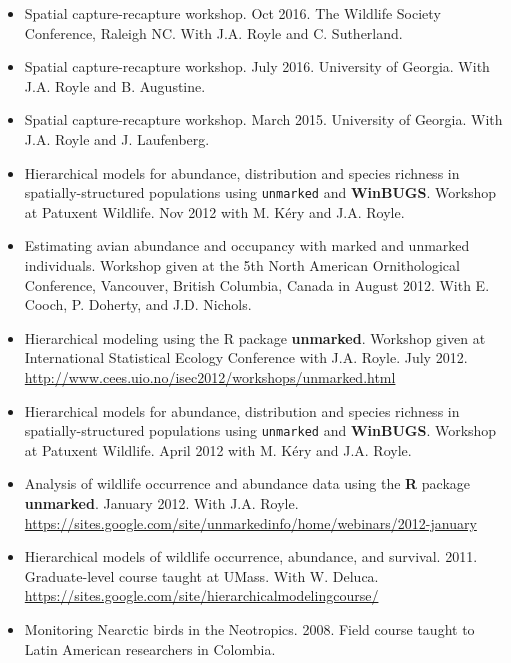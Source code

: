 \begin{itemize}

\item Spatial capture-recapture workshop. Oct 2016. The Wildlife
  Society Conference, Raleigh NC. With J.A. Royle and C. Sutherland. 

\item Spatial capture-recapture workshop. July 2016. University of
  Georgia. With J.A. Royle and B. Augustine.

\item Spatial capture-recapture workshop. March 2015. University of
  Georgia. With J.A. Royle and J. Laufenberg.

\item Hierarchical models for abundance, distribution
  and species richness in spatially-structured populations using
  \texttt{unmarked} and \textbf{WinBUGS}. Workshop at Patuxent Wildlife.
  Nov 2012 with M. K\'{e}ry and J.A. Royle.

\item Estimating avian abundance and occupancy with marked and
  unmarked individuals. Workshop given at the 5th North American
  Ornithological Conference, Vancouver, British Columbia,
  Canada in August 2012. With E. Cooch, P. Doherty, and J.D. Nichols.

\item Hierarchical modeling using the R package
  \textbf{unmarked}. Workshop given at International Statistical
  Ecology Conference with J.A. Royle. July 2012.
  \url{http://www.cees.uio.no/isec2012/workshops/unmarked.html}

\item Hierarchical models for abundance, distribution
  and species richness in spatially-structured populations using
  \texttt{unmarked} and \textbf{WinBUGS}. Workshop at Patuxent Wildlife.
  April 2012 with M. K\'{e}ry and J.A. Royle.

\item Analysis of wildlife occurrence and abundance data using the \textbf{R}
  package \textbf{unmarked}. January 2012. With J.A. Royle.
  \url{https://sites.google.com/site/unmarkedinfo/home/webinars/2012-january}

\item Hierarchical models of wildlife occurrence, abundance, and
  survival. 2011. Graduate-level course taught at
  UMass. With W. Deluca. \\
  \url{https://sites.google.com/site/hierarchicalmodelingcourse/}

\item Monitoring Nearctic birds in the Neotropics. 2008. Field course
  taught to Latin American researchers in Colombia.

\end{itemize}



